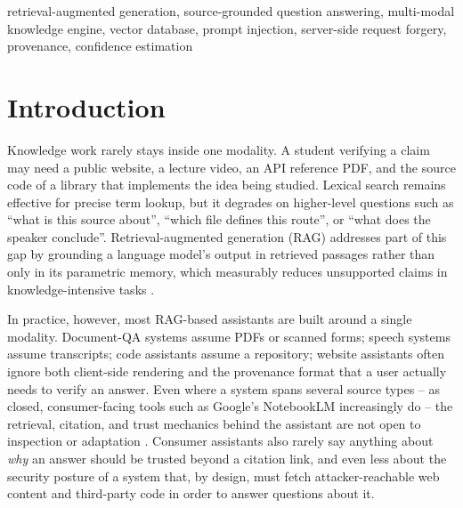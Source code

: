 \documentclass[conference]{IEEEtran}
\begin{document}
\begin{IEEEkeywords}
retrieval-augmented generation, source-grounded question answering,
multi-modal knowledge engine, vector database, prompt injection,
server-side request forgery, provenance, confidence estimation
\end{IEEEkeywords}

\section{Introduction}

Knowledge work rarely stays inside one modality. A student verifying a
claim may need a public website, a lecture video, an API reference PDF,
and the source code of a library that implements the idea being
studied. Lexical search remains effective for precise term lookup, but
it degrades on higher-level questions such as ``what is this source
about'', ``which file defines this route'', or ``what does the speaker
conclude''. Retrieval-augmented generation (RAG) addresses part of this
gap by grounding a language model's output in retrieved passages rather
than only in its parametric memory, which measurably reduces unsupported
claims in knowledge-intensive tasks \cite{lewis2020rag,karpukhin2020dpr}.

In practice, however, most RAG-based assistants are built around a
single modality. Document-QA systems assume PDFs or scanned forms;
speech systems assume transcripts; code assistants assume a repository;
website assistants often ignore both client-side rendering and the
provenance format that a user actually needs to verify an answer. Even
where a system spans several source types -- as closed, consumer-facing
tools such as Google's NotebookLM increasingly do -- the retrieval,
citation, and trust mechanics behind the assistant are not open to
inspection or adaptation \cite{notebooklm2026}. Consumer assistants also
rarely say anything about \emph{why} an answer should be trusted beyond a
citation link, and even less about the security posture of a system that,
by design, must fetch attacker-reachable web content and third-party code
in order to answer questions about it.
\end{document}
